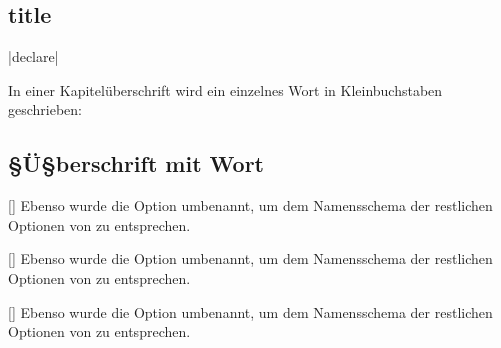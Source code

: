 \documentclass[english,ngerman,ToDo=no]{tudscrman3}
\begin{document}
%
%
%

\begin{theindex}
  \item {}
  \item {}
\end{theindex}

\section{title}

|declare|

\makeatletter
\meaning\@currentHref


\begin{Example}
In einer Kapitelüberschrift wird ein einzelnes Wort in Kleinbuchstaben 
geschrieben:
\begin{Code}[escapechar=§]
\chapter{§Ü§berschrift mit  Wort}
\end{Code}
\end{Example}

\meaning\@currentHref

\begin{Declaration}[v2.00]{[\PBoolean]}
%
Ebenso wurde die Option  umbenannt, um dem Namensschema der 
restlichen Optionen von \TUDScript zu entsprechen.
\end{Declaration}

\begin{SubDeclaration}{}
\begin{Declaration}[v2.00]{[\PBoolean]}
%
Ebenso wurde die Option  umbenannt, um dem Namensschema der 
restlichen Optionen von \TUDScript zu entsprechen.

  

\end{Declaration}
\begin{Declaration}[v2.00]{[\PBoolean]}
\printdeclarationlist%
%
Ebenso wurde die Option  umbenannt, um dem Namensschema der 
restlichen Optionen von \TUDScript zu entsprechen.
\end{Declaration}

\Blindtext

  

\end{SubDeclaration}
\end{document}
